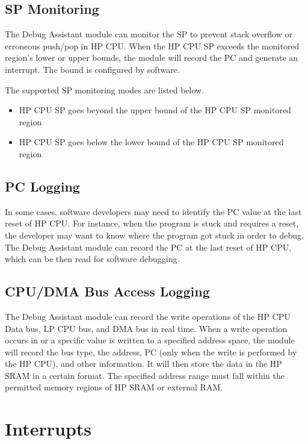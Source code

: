 \documentclass[main\_\_EN.tex]{subfiles}
\begin{document}
\subsection{SP Monitoring}

The Debug Assistant module can monitor the SP to prevent stack overflow or erroneous push/pop in HP CPU. When the HP CPU SP exceeds the monitored region's lower or upper bounds, the module will record the PC and generate an interrupt. The bound is configured by software. 

The supported SP monitoring modes are listed below.

\begin{itemize}
    \item HP CPU SP goes beyond the upper bound of the HP CPU SP monitored region
    \item HP CPU SP goes below the lower bound of the HP CPU SP monitored region
\end{itemize}

\subsection{PC Logging}

In some cases, software developers may need to identify the PC value at the last reset of HP CPU. For instance, when the program is stuck and requires a reset, the developer may want to know where the program got stuck in order to debug. The Debug Assistant module can record the PC at the last reset of HP CPU, which can be then read for software debugging.

\subsection{CPU/DMA Bus Access Logging}

The Debug Assistant module can record the write operations of the HP CPU Data bus, LP CPU bus, and DMA bus in real time. When a write operation occurs in or a specific value is written to a specified address space, the module will record the bus type, the address, PC (only when the write is performed by the HP CPU), and other information. It will then store the data in the HP SRAM in a certain format. The specified address range must fall within the permitted memory regions of HP SRAM or external RAM.



\section{Interrupts}
\label{sec:dbgassist-interrupts}
\end{document}
